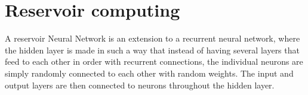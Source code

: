 \section{Reservoir computing}

A reservoir Neural Network is an extension to a recurrent neural network, where the hidden layer is made in such a way that instead of having several layers that feed to each other in order with recurrent connections, the individual neurons are simply randomly connected to each other with random weights.
The input and output layers are then connected to neurons throughout the hidden layer.